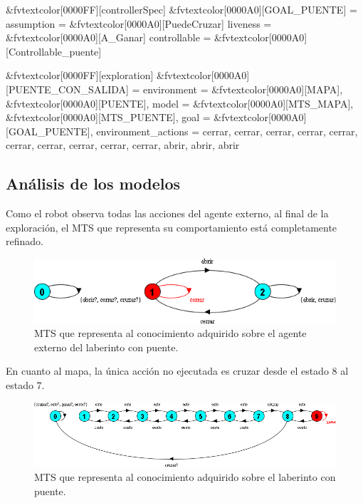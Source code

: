 \begin{Code}[commandchars=&\[\]]
&fvtextcolor[0000FF][controllerSpec] &fvtextcolor[0000A0][GOAL_PUENTE] = {
    assumption   = {&fvtextcolor[0000A0][PuedeCruzar]}
    liveness     = {&fvtextcolor[0000A0][A_Ganar]}
    controllable = {&fvtextcolor[0000A0][Controllable_puente]}
}

&fvtextcolor[0000FF][exploration] &fvtextcolor[0000A0][PUENTE_CON_SALIDA] = {
    environment         = {&fvtextcolor[0000A0][MAPA], &fvtextcolor[0000A0][PUENTE]},
    model               = {&fvtextcolor[0000A0][MTS_MAPA], &fvtextcolor[0000A0][MTS_PUENTE]},
    goal                = {&fvtextcolor[0000A0][GOAL_PUENTE]},
    environment_actions = {{cerrar, cerrar, cerrar, cerrar, cerrar,
                            cerrar, cerrar, cerrar, cerrar, cerrar, 
                            abrir, abrir, abrir}}
}
\end{Code}

\clearpage

\subsection{Análisis de los modelos}

Como el robot observa todas las acciones del agente externo, al final de la exploración, el MTS que representa su comportamiento está completamente refinado.

\begin{figure}[H]
	\centering
		\includegraphics[width=1.0\textwidth]{Imagenes/Laberintos/puente_modelo_puente.png}
	\caption{MTS que representa al conocimiento adquirido sobre el agente externo del laberinto con puente.}
	\label{fig:puente_modelo_puente}
\end{figure}

En cuanto al mapa, la única acción no ejecutada es cruzar desde el estado 8 al estado 7.

\begin{figure}[H]
	\centering
		\includegraphics[width=1.0\textwidth]{Imagenes/Laberintos/puente_modelo_mapa.png}
	\caption{MTS que representa al conocimiento adquirido sobre el laberinto con puente.}
	\label{fig:puente_modelo_mapa}
\end{figure}

